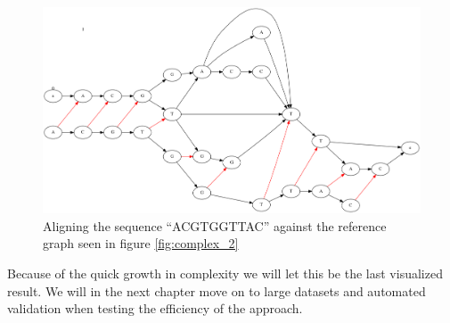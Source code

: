 \documentclass[thesis.tex]{subfiles}
\begin{document}
\begin{figure}[H]
  \begin{mdframed}
    \includegraphics[width=\textwidth]{output/complex-align.png}
  \end{mdframed}
  \caption[Aligning a sequence against \ref{fig:complex_2}]{Aligning the sequence ``ACGTGGTTAC'' against the reference graph seen in figure \ref{fig:complex_2}}
\end{figure}
Because of the quick growth in complexity we will let this be the last visualized result. We will in the next chapter move on to large datasets and automated validation when testing the efficiency of the approach.
\end{document}
